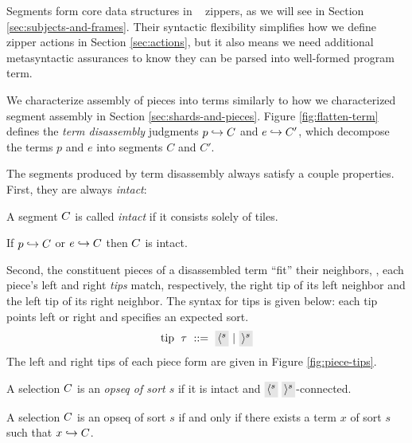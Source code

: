 Segments form core data structures in \ty~ zippers,
as we will see in Section \ref{sec:subjects-and-frames}.
Their syntactic flexibility simplifies how we define
zipper actions in Section
\ref{sec:actions}, but it also means we need additional
metasyntactic assurances to know they can be parsed into
well-formed program term.

We characterize assembly of pieces into terms
similarly to how we characterized segment assembly
in Section \ref{sec:shards-and-pieces}.
Figure \ref{fig:flatten-term} defines the \emph{term
disassembly} judgments $p\hookrightarrow C$
and $e\hookrightarrow C'$, which decompose
the terms $p$ and $e$ into segments $C$ and $C'$.



The segments produced by term disassembly always satisfy
a couple properties. First, they are always \emph{intact}:
\begin{definition}
  A segment $C$ is called \emph{intact} if it consists
  solely of tiles.
\end{definition}
\begin{lemma}
  If $p\hookrightarrow C$ or $e\hookrightarrow C$ then $C$ is intact.
\end{lemma}

Second, the constituent pieces of a disassembled term ``fit''
their neighbors, \ie, each piece's left and right \emph{tips}
match, respectively, the right tip of its left neighbor
and the left tip of its right neighbor.
The syntax for tips is given below: each tip points left
or right and specifies an expected sort.
\[\arraycolsep=3pt\begin{array}{rlrl}
    \text{tip} & \tip & ::= & \lltip{s} ~\vert~ \rrtip{s}
\end{array}\]
The left and right tips of each piece form are given in
Figure \ref{fig:piece-tips}. 



\begin{definition}
  A selection $C$ is an \emph{opseq of sort $s$} if
  it is intact and $\lltip{s}~\rrtip{s}$-connected.
\end{definition}

\begin{theorem}
  A selection $C$ is an opseq of sort $s$
  if and only if there exists a term $x$ of sort $s$ such that
  $x\hookrightarrow C$.
\end{theorem}


